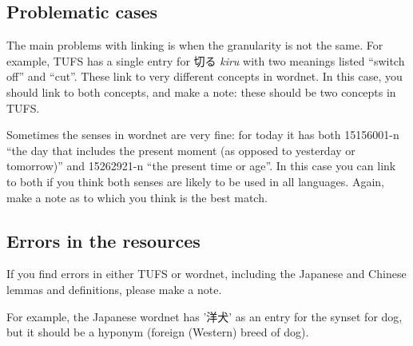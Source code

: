 \documentclass[11pt]{article}
\begin{document}
\subsection{Problematic cases}

The main problems with linking is when the granularity is not the
same.  For example, TUFS has a single entry for 切る \textit{kiru} with
two meanings listed ``switch off'' and ``cut''.    These link to very
different concepts in  wordnet.  In this case, you should link to both
concepts, and make a note: these should be two concepts in TUFS.

Sometimes the senses in wordnet are very fine: for today it has both 
15156001-n ``the day that includes the present moment (as opposed to
yesterday or tomorrow)'' and 15262921-n ``the present time or age''.
In this case you can link to both if you think both senses are likely
to be used in all languages.  Again, make a note as to which you think
is the best match.




\subsection{Errors in the resources}

If you find errors in either TUFS or wordnet, including the Japanese
and Chinese lemmas and definitions, please make a note.

For example, the Japanese wordnet has '洋犬' as an entry for the
synset for dog, but it should be a hyponym (foreign (Western) breed of
dog).
\end{document}
